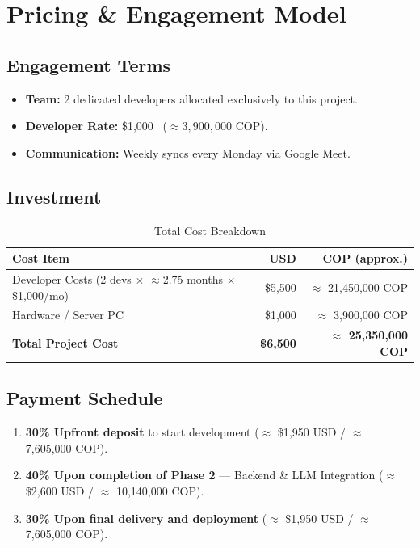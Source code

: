 \documentclass[11pt, a4paper]{article}
\begin{document}
\section{Pricing \& Engagement Model}

\subsection*{Engagement Terms}

\begin{itemize}
  \item \textbf{Team:} 2 dedicated developers allocated exclusively to this project.
  \item \textbf{Developer Rate:} \$1{,}000\ 
    ($\approx 3{,}900{,}000$ COP).
  \item \textbf{Communication:} Weekly syncs every Monday via Google Meet.
\end{itemize}

\subsection*{Investment}

\begin{table}[H]
  \centering
  \caption{Total Cost Breakdown}
  \label{tab:cost}
  \renewcommand{\arraystretch}{1.3}
  \begin{tabular}{l r r}
    \toprule
    \textbf{Cost Item} & \textbf{USD} & \textbf{COP (approx.)} \\
    \midrule
    Developer Costs (2 devs $\times$ $\approx$2.75 months $\times$
    \$1{,}000/mo) & \$5{,}500 & $\approx$ 21{,}450{,}000 COP \\
    Hardware / Server PC & \$1{,}000 & $\approx$ 3{,}900{,}000 COP \\
    \midrule
    \textbf{Total Project Cost} & \textbf{\$6{,}500} & \textbf{$\approx$
    25{,}350{,}000 COP} \\
    \bottomrule
  \end{tabular}
\end{table}

\subsection*{Payment Schedule}

\begin{enumerate}
  \item \textbf{30\% Upfront deposit} to start development
    ($\approx$ \$1{,}950 USD / $\approx$ 7{,}605{,}000 COP).

  \item \textbf{40\% Upon completion of Phase 2} --- Backend \& LLM Integration
    ($\approx$ \$2{,}600 USD / $\approx$ 10{,}140{,}000 COP).

  \item \textbf{30\% Upon final delivery and deployment}
    ($\approx$ \$1{,}950 USD / $\approx$ 7{,}605{,}000 COP).
\end{enumerate}
\end{document}
